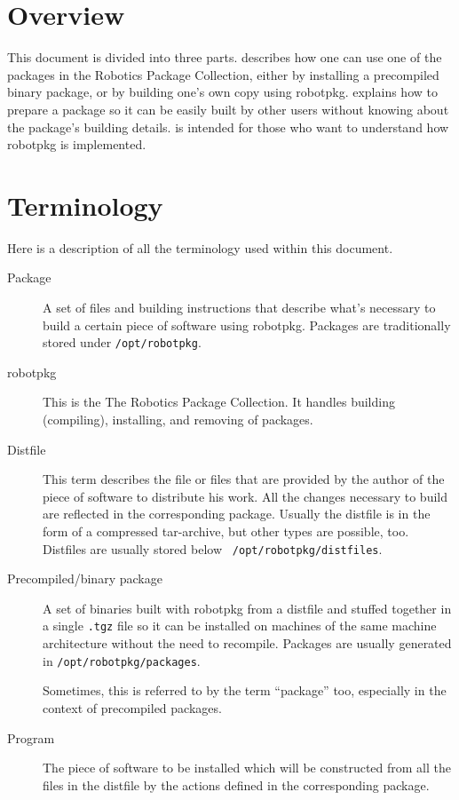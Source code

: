 \section{Overview} %

This document is divided  into three parts.  
describes how  one  can  use  one of   the  packages  in the  Robotics  Package
Collection, either  by installing a precompiled binary  package, or by building
one's own  copy  using  robotpkg.   
explains how  to prepare a package so  it can be  easily  built by  other users
without     knowing     about     the     package's    building        details.
 is  intended for  those   who want to
understand how robotpkg is implemented.


\section{Terminology} %

Here is a description of all the terminology used within this document.

\begin{description}
   \item[Package] A set of files and building instructions that describe what's
   necessary to build a certain piece  of software using robotpkg. Packages are
   traditionally stored under {\tt /opt/robotpkg}.

   \item[robotpkg]  This is  the The Robotics   Package Collection.  It handles
   building (compiling), installing, and removing of packages.

   \item[Distfile] This  term describes the file  or files that are provided by
   the author of the piece of software to distribute  his work. All the changes
   necessary to  build are reflected  in the corresponding package. Usually the
   distfile is in  the form of a  compressed  tar-archive, but other  types are
   possible,     too.    Distfiles   are      usually   stored    below    {\tt
   /opt/robotpkg/distfiles}.

   \item[Precompiled/binary package] A set of binaries built with robotpkg from
   a distfile  and stuffed together in a  single {\tt .tgz} file   so it can be
   installed  on machines of the same  machine architecture without the need to
   recompile. Packages are usually generated in {\tt /opt/robotpkg/packages}.

   Sometimes, this is  referred to by the  term ``package''  too, especially in
   the context of precompiled packages.

   \item[Program]  The  piece  of  software to  be  installed  which  will   be
   constructed from all the files in the distfile by the actions defined in the
   corresponding package.

\end{description}


